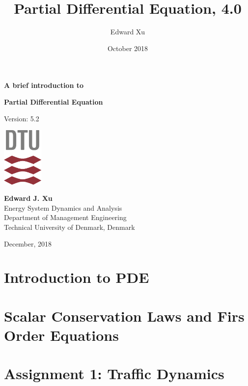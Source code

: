 \documentclass{article}
\title{Partial Differential Equation, 4.0}
\author{Edward Xu}
\date{October 2018}
\begin{document}
\begin{titlepage}
    \centering
        \vspace*{2cm}
 
        \large{\textbf{A brief introduction to}}
        
        \vspace{0.5cm}
        \Large{\textbf{Partial Differential Equation}}
        
        \vspace{1cm}
        \large{Version: 5.2}
 
        \vspace{4cm}
        \includegraphics[width=0.15\textwidth]{DTU-logo}
 
        \vfill
        
        \textbf{Edward J. Xu} \\
        Energy System Dynamics and Analysis \\
        Department of Management Engineering \\
        Technical University of Denmark, Denmark
        
        \vspace{1.5cm}
        
        December, 2018
        
\end{titlepage}

\section{Introduction to PDE}

\clearpage

\section{Scalar Conservation Laws and Firs Order Equations}

\clearpage

\section{Assignment 1: Traffic Dynamics}

\clearpage
\end{document}
